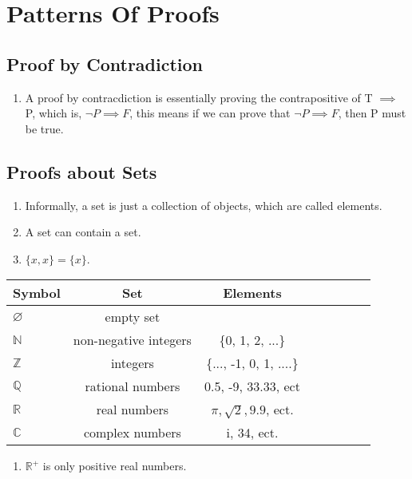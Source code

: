 \documentclass{article}
\begin{document}
	\section{Patterns Of Proofs}
	\subsection{Proof by Contradiction}
\begin{enumerate}

\item A proof by contracdiction is essentially proving the contrapositive of T $\implies$ P, which is, $\neg P \implies F$, this means if we can prove that $\neg P \implies F$, then P must be true.
\end{enumerate}
\subsection{Proofs about Sets}
\begin{enumerate}
	\item Informally, a set is just a collection of objects, which are called elements.
	\item A set can contain a set.
	\item $\{x, x\} = \{x\}$.
\end{enumerate}

\begin{tabular}{l*{6}{c}r}
Symbol          & Set & Elements\\
\hline
$\varnothing$ & empty set & \\
$\mathbb{N}$ & non-negative integers& \{0, 1, 2, ...\}  \\
$\mathbb{Z}$ & integers& \{..., -1, 0, 1, ....\}  \\
$\mathbb{Q}$ & rational numbers & 0.5, -9, 33.33, ect  \\
$\mathbb{R}$   &  real numbers & $\pi, \sqrt{2}, 9.9$,  ect. \\
$\mathbb{C}$  & complex numbers &  i, 34, ect.  \\
\end{tabular}
\begin{enumerate}
	\item $\mathbb{R}^{+}$ is only positive real numbers.
\end{enumerate}
\end{document}
